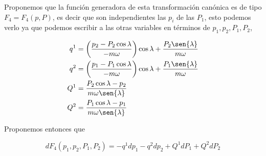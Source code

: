 \documentclass[a4paper,10pt]{article}
\numberwithin{equation}{section}
\begin{document}
Proponemos que la función generadora de esta transformación canónica es de tipo 
$F_4 = F_4(p,P)$, es decir que son independientes las $p_i$ de las $P_1$, esto podemos 
verlo ya que podemos escribir a las otras variables en términos de $p_1,p_2,P_1,P_2$, 

\begin{align*}
 q^1 &= \left( \frac{p_2 - P_2\cos{\lambda}}{-m\omega}\right)\cos{\lambda} 
 + \frac{P_2\sen{\lambda}}{m\omega} \\
 q^2 &= \left(\frac{p_1 - P_1\cos{\lambda}}{-m\omega}\right)\cos{\lambda} 
 + \frac{P_1\sen{\lambda}}{m\omega} \\
 Q^1 &= \frac{P_2\cos{\lambda} - p_2}{m\omega\sen{\lambda}}\\
 Q^2 &= \frac{P_1\cos{\lambda} - p_1}{m\omega\sen{\lambda}}
\end{align*}

Proponemos entonces que 

\begin{equation}
 dF_4(p_1,p_2,P_1,P_2) = -q^1dp_1 - q^2dp_2 + Q^1dP_1 + Q^2dP_2 
\end{equation}
\end{document}
